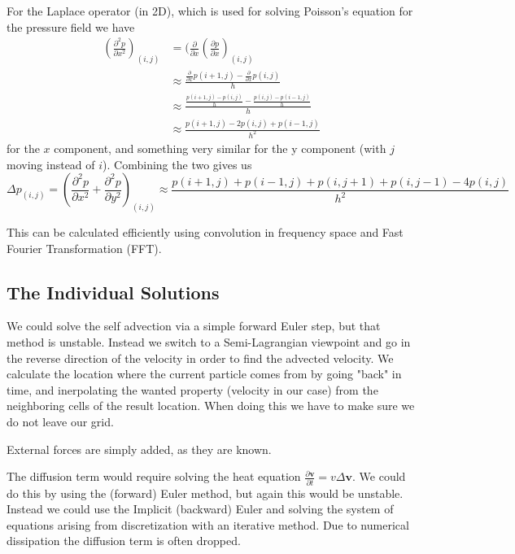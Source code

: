 \documentclass{article}
\begin{document}
For the Laplace operator (in 2D), which is used for solving Poisson's equation for the pressure field we have
\begin{align}
    (\frac{\partial^2 p}{\partial x^2})_{(i,j)} &= (\frac{\partial}{\partial x} (\frac{\partial p}{\partial x})_{(i,j)}\\
        &\approx \frac{ \frac{\partial}{\partial x} p(i+1,j) - \frac{\partial}{\partial x} p(i,j)} {h}\\
        &\approx \frac{ \frac{p(i+1, j) - p(i,j)}{h} - \frac{p(i,j) - p(i-1, j)}{h}}{h}\\
        &\approx \frac{p(i+1, j) - 2p(i,j) + p(i-1,j)}{h^2}
\end{align}
for the $x$ component, and something very similar for the y component (with $j$ moving instead of $i$).
Combining the two gives us
\begin{equation}
    \Delta p_{(i,j)} = (\frac{\partial^2 p}{\partial x^2} + \frac{\partial^2p}{\partial y^2})_{(i,j)} \approx \frac{p(i+1, j) + p(i-1,j) + p(i, j+1) + p(i, j-1) - 4p(i,j)}{h^2}
\end{equation}

This can be calculated efficiently using convolution in frequency space and Fast Fourier Transformation (FFT).

\subsection{The Individual Solutions}
We could solve the self advection via a simple forward Euler step, but that method is unstable.
Instead we switch to a Semi-Lagrangian viewpoint and go in the reverse direction of the velocity in order to find the advected velocity.
We calculate the location where the current particle comes from by going "back" in time, and inerpolating the wanted property (velocity in our case) from the neighboring cells of the result location.
When doing this we have to make sure we do not leave our grid.

External forces are simply added, as they are known.

The diffusion term would require solving the heat equation $\frac{\partial \bm{v}}{\partial t} = v \Delta \bm{v}$.
We could do this by using the (forward) Euler method, but again this would be unstable. 
Instead we could use the Implicit (backward) Euler and solving the system of equations arising from discretization with an iterative method.
Due to numerical dissipation the diffusion term is often dropped.
\end{document}
